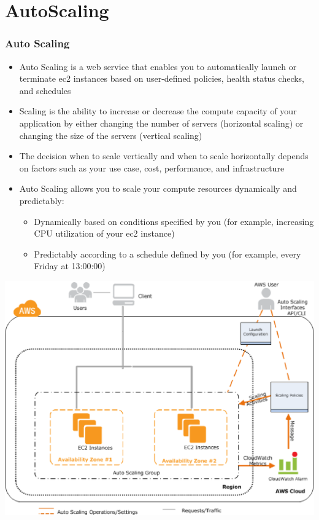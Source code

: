 \documentclass{beamer}
\begin{document}
\section{AutoScaling}
\begin{frame}
\frametitle{Auto Scaling}
\begin{itemize}
 \item Auto Scaling is a web service that enables you to automatically launch or terminate \acrshort{ec2} instances based on user-defined policies, health status checks, and schedules
 \item Scaling is the ability to increase or decrease the compute capacity of your application by either changing the number of servers (horizontal scaling) or changing the size of the servers (vertical scaling)
\item The decision when to scale vertically and when to scale horizontally depends on factors such as your use case, cost, performance, and infrastructure
\item Auto Scaling allows you to scale your compute resources dynamically and predictably:
\begin{itemize}
 \item Dynamically based on conditions specified by you (for example, increasing CPU utilization of your \acrshort{ec2} instance)
 \item Predictably according to a schedule defined by you (for example, every Friday at 13:00:00)
\end{itemize}

\end{itemize}

\begin{center}
 \item \includegraphics[scale=0.4]{AS-WorkFlow.eps}
\end{center}

\end{frame}
\end{document}
